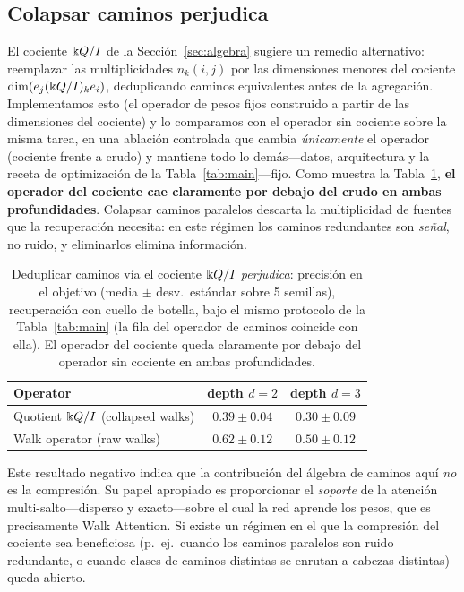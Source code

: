 \subsection{Colapsar caminos perjudica}

El cociente $\Bbbk Q/I$ de la Sección~\ref{sec:algebra} sugiere un
remedio alternativo: reemplazar las multiplicidades $n_k(i,j)$ por las dimensiones
menores del cociente $\dim(e_j(\Bbbk Q/I)_k e_i)$, deduplicando caminos equivalentes
antes de la agregación. Implementamos esto (el operador de pesos fijos construido a partir de las
dimensiones del cociente) y lo comparamos con el operador sin cociente sobre la
misma tarea, en una ablación controlada que cambia \emph{únicamente} el
operador (cociente frente a crudo) y mantiene todo lo demás---datos,
arquitectura y la receta de optimización de la Tabla~\ref{tab:main}---fijo. Como
muestra la Tabla~\ref{tab:quotient}, \textbf{el operador del cociente cae
claramente por debajo del crudo en ambas profundidades}. Colapsar caminos
paralelos descarta la multiplicidad de fuentes que la recuperación necesita: en
este régimen los caminos redundantes son \emph{señal}, no ruido, y eliminarlos
elimina información.

\begin{table}[t]
\centering
\caption{Deduplicar caminos vía el cociente $\Bbbk Q/I$ \emph{perjudica}: precisión
en el objetivo (media $\pm$ desv.\ estándar sobre 5 semillas), recuperación con
cuello de botella, bajo el mismo protocolo de la Tabla~\ref{tab:main} (la fila
del operador de caminos coincide con ella). El operador del cociente queda
claramente por debajo del operador sin cociente en ambas profundidades.}
\label{tab:quotient}
\begin{tabular}{lcc}
\toprule
\textbf{Operator} & \textbf{depth $d=2$} & \textbf{depth $d=3$} \\
\midrule
Quotient $\Bbbk Q/I$ (collapsed walks) & $0.39\pm0.04$ & $0.30\pm0.09$ \\
Walk operator (raw walks)          & $\mathbf{0.62\pm0.12}$ & $\mathbf{0.50\pm0.12}$ \\
\bottomrule
\end{tabular}
\end{table}

Este resultado negativo indica que la contribución del álgebra de caminos
aquí \emph{no} es la compresión. Su papel apropiado es proporcionar
el \emph{soporte} de la atención multi-salto---disperso y exacto---sobre
el cual la red aprende los pesos, que es precisamente Walk
Attention. Si existe un régimen en el que la compresión del cociente sea
beneficiosa (p.\ ej.\ cuando los caminos paralelos son ruido redundante, o
cuando clases de caminos distintas se enrutan a cabezas distintas) queda
abierto.

